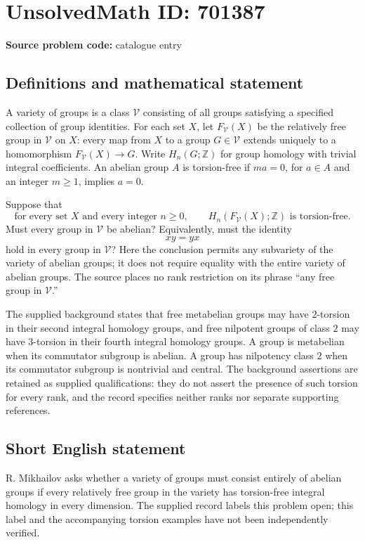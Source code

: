 \documentclass[11pt]{article}
\newcommand{\Z}{\mathbb{Z}}
\begin{document}
\section*{UnsolvedMath ID: 701387}
\textbf{Source problem code:} catalogue entry
\subsection{Definitions and mathematical statement}
A variety of groups is a class \(\mathcal V\) consisting of all groups satisfying a specified collection of group identities. For each set \(X\), let \(F_{\mathcal V}(X)\) be the relatively free group in \(\mathcal V\) on \(X\): every map from \(X\) to a group \(G\in\mathcal V\) extends uniquely to a homomorphism \(F_{\mathcal V}(X)\to G\). Write \(H_n(G;\Z)\) for group homology with trivial integral coefficients. An abelian group \(A\) is torsion-free if \(ma=0\), for \(a\in A\) and an integer \(m\geq 1\), implies \(a=0\).

Suppose that
\[
\text{for every set }X\text{ and every integer }n\geq 0,\qquad H_n(F_{\mathcal V}(X);\Z)\text{ is torsion-free}.
\]
Must every group in \(\mathcal V\) be abelian? Equivalently, must the identity
\[
xy=yx
\]
hold in every group in \(\mathcal V\)? Here the conclusion permits any subvariety of the variety of abelian groups; it does not require equality with the entire variety of abelian groups. The source places no rank restriction on its phrase ``any free group in \(\mathcal V\).''

The supplied background states that free metabelian groups may have \(2\)-torsion in their second integral homology groups, and free nilpotent groups of class \(2\) may have \(3\)-torsion in their fourth integral homology groups. A group is metabelian when its commutator subgroup is abelian. A group has nilpotency class \(2\) when its commutator subgroup is nontrivial and central. The background assertions are retained as supplied qualifications: they do not assert the presence of such torsion for every rank, and the record specifies neither ranks nor separate supporting references.
\subsection{Short English statement}
R. Mikhailov asks whether a variety of groups must consist entirely of abelian groups if every relatively free group in the variety has torsion-free integral homology in every dimension. The supplied record labels this problem open; this label and the accompanying torsion examples have not been independently verified.
\end{document}
